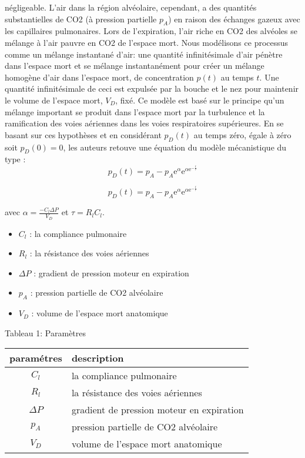\documentclass[12pt,]{article}
\providecommand{\tightlist}{%
  \setlength{\itemsep}{0pt}\setlength{\parskip}{0pt}}
\begin{document}
négligeable. L'air dans la région alvéolaire, cependant, a des quantités
substantielles de CO2 (à pression partielle \(p_{A}\)) en raison des
échanges gazeux avec les capillaires pulmonaires. Lors de l'expiration,
l'air riche en CO2 des alvéoles se mélange à l'air pauvre en CO2 de
l'espace mort. Nous modélisons ce processus comme un mélange instantané
d'air: une quantité infinitésimale d'air pénètre dans l'espace mort et
se mélange instantanément pour créer un mélange homogène d'air dans
l'espace mort, de concentration \(p(t)\) au temps \(t\). Une quantité
infinitésimale de ceci est expulsée par la bouche et le nez pour
maintenir le volume de l'espace mort, \(V_{D}\), fixé. Ce modèle est
basé sur le principe qu'un mélange important se produit dans l'espace
mort par la turbulence et la ramification des voies aériennes dans les
voies respiratoires supérieures. En se basant sur ces hypothèses et en
considérant \(p_{D}(t)\) au temps zéro, égale à zéro soit
\(p_{D}(0)=0\), les auteurs retouve une équation du modèle mécanistique
du type : \[
p_{D}(t)=p_{A} - p_{A} \mathrm{e}^{\alpha} \mathrm{e}^{\alpha\mathrm{e}^{-\frac{t}{\tau}}} 
\tag{**}
\]

\begin{equation}
  p_{D}(t)=p_{A} - p_{A} \mathrm{e}^{\alpha} \mathrm{e}^{\alpha\mathrm{e}^{-\frac{t}{\tau}}}
\label{eq:modèle mécanique 1}
\end{equation}

avec \(\alpha= \frac{-C_{l}\Delta P}{V_{D}}\) et \(\tau=R_{l}C_{l}\).

\begin{itemize}
\tightlist
\item
  \(C_{l}\) : la compliance pulmonaire
\item
  \(R_{l}\) : la résistance des voies aériennes
\item
  \(\Delta P\) : gradient de pression moteur en expiration
\item
  \(p_{A}\) : pression partielle de CO2 alvéolaire
\item
  \(V_{D}\) : volume de l'espace mort anatomique
\end{itemize}

Tableau 1: Paramètres

\begin{longtable}[]{@{}cl@{}}
\toprule
paramétres & description\tabularnewline
\midrule
\endhead
\(C_{l}\) & la compliance pulmonaire\tabularnewline
\(R_{l}\) & la résistance des voies aériennes\tabularnewline
\(\Delta P\) & gradient de pression moteur en expiration\tabularnewline
\(p_{A}\) & pression partielle de CO2 alvéolaire\tabularnewline
\(V_{D}\) & volume de l'espace mort anatomique\tabularnewline
\bottomrule
\end{longtable}
\end{document}
